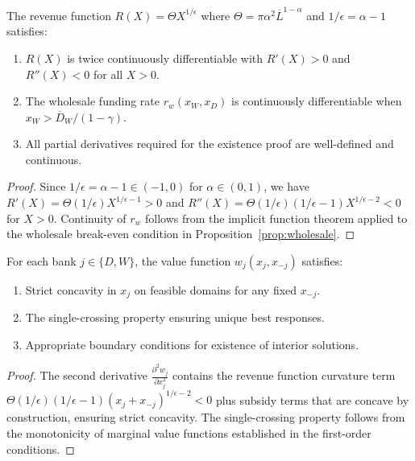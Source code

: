 \documentclass[12pt]{article}
\begin{document}
\begin{lemma}\label{lem:revenue-regularity}
The revenue function $R(X) = \Theta X^{1/\epsilon}$ where $\Theta = \pi\alpha^2\overline{L}^{1-\alpha}$ and $1/\epsilon = \alpha-1$ satisfies:
\begin{enumerate}
    \item $R(X)$ is twice continuously differentiable with $R'(X) > 0$ and $R''(X) < 0$ for all $X > 0$.
    \item The wholesale funding rate $r_w(x_W, x_D)$ is continuously differentiable when $x_W > \overline{D}_W/(1-\gamma)$.
    \item All partial derivatives required for the existence proof are well-defined and continuous.
\end{enumerate}
\end{lemma}

\begin{proof}
Since $1/\epsilon = \alpha - 1 \in (-1,0)$ for $\alpha \in (0,1)$, we have $R'(X) = \Theta(1/\epsilon)X^{1/\epsilon-1} > 0$ and $R''(X) = \Theta(1/\epsilon)(1/\epsilon-1)X^{1/\epsilon-2} < 0$ for $X > 0$. Continuity of $r_w$ follows from the implicit function theorem applied to the wholesale break-even condition in Proposition~\ref{prop:wholesale}.
\end{proof}

\begin{lemma}\label{lem:concavity-global}
For each bank $j \in \{D,W\}$, the value function $w_j(x_j, x_{-j})$ satisfies:
\begin{enumerate}
    \item Strict concavity in $x_j$ on feasible domains for any fixed $x_{-j}$.
    \item The single-crossing property ensuring unique best responses.
    \item Appropriate boundary conditions for existence of interior solutions.
\end{enumerate}
\end{lemma}

\begin{proof}
The second derivative $\frac{\partial^2 w_j}{\partial x_j^2}$ contains the revenue function curvature term $\Theta(1/\epsilon)(1/\epsilon-1)(x_j+x_{-j})^{1/\epsilon-2} < 0$ plus subsidy terms that are concave by construction, ensuring strict concavity. The single-crossing property follows from the monotonicity of marginal value functions established in the first-order conditions.
\end{proof}
\end{document}

